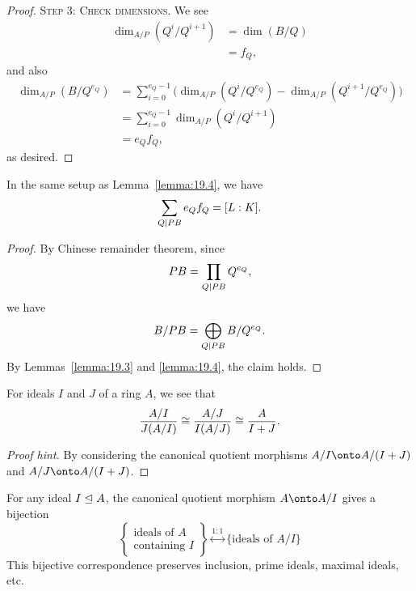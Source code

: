\begin{proof}
\textsc{Step 3: Check dimensions}.
We see
\begin{subequations}
  \begin{align}
\dim_{A/P}(Q^{i}/Q^{i+1}) &= \dim(B/Q)\\
&= f_{Q},
  \end{align}
\end{subequations}
and also
\begin{subequations}
  \begin{align}
\dim_{A/P}(B/Q^{e_{Q}})
&=\sum^{e_{Q}-1}_{i=0}\bigl(\dim_{A/P}(Q^{i}/Q^{e_{Q}})-\dim_{A/P}(Q^{i+1}/Q^{e_{Q}})\bigr)\\
&=\sum^{e_{Q}-1}_{i=0}\dim_{A/P}(Q^{i}/Q^{i+1})\\
&=e_{Q}f_{Q},
  \end{align}
\end{subequations}
as desired.
\end{proof}

\begin{corollary}\label{cor:19.5}
In the same setup as Lemma~\ref{lemma:19.4}, we have
\begin{equation*}
\sum_{Q\mid PB}e_{Q}f_{Q}=[L:K].
\end{equation*}
\end{corollary}

\begin{proof}
By Chinese remainder theorem, since
\begin{equation}
PB=\prod_{Q\mid PB}Q^{e_{Q}},
\end{equation}
we have
\begin{equation}
B/PB=\bigoplus_{Q\mid PB}B/Q^{e_{Q}}.
\end{equation}
By Lemmas~\ref{lemma:19.3} and \ref{lemma:19.4}, the claim holds.
\end{proof}

\begin{fact}\label{fact:math120b:winter2026:lecture26:fact1}
For ideals $I$ and $J$ of a ring $A$, we see that
\begin{equation*}
\frac{A/I}{J(A/I)}\cong\frac{A/J}{I(A/J)}\cong\frac{A}{I+J}.
\end{equation*}
\end{fact}
\begin{proof}[Proof hint]
By considering the canonical quotient morphisms $A/I\onto A/(I+J)$
and $A/J\onto A/(I+J)$.
\end{proof}

\begin{fact}\label{fact:math120b:winter2026:lecture26:fact2}
For any ideal $I\mathrel{\trianglelefteq} A$, the canonical quotient morphism $A\onto A/I$
gives a bijection
\begin{equation*}
\left\{\begin{matrix}\mbox{ideals of }A\\
\mbox{containing }I\end{matrix}\right\}\stackrel{1:1}{\longleftrightarrow}\{\mbox{ideals of }A/I\}
\end{equation*}
This bijective correspondence preserves inclusion, prime ideals,
maximal ideals, etc.
\end{fact}

